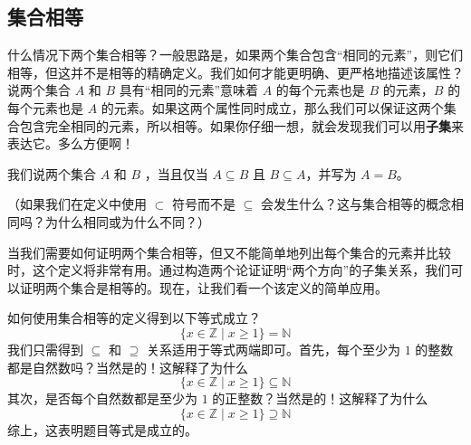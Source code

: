 \subsection{集合相等}

什么情况下两个集合相等？一般思路是，如果两个集合包含``相同的元素''，则它们相等，但这并不是相等的精确定义。我们如何才能更明确、更严格地描述该属性？说两个集合 $A$ 和 $B$ 具有``相同的元素''意味着 $A$ 的每个元素也是 $B$ 的元素，$B$ 的每个元素也是 $A$ 的元素。如果这两个属性同时成立，那么我们可以保证这两个集合包含完全相同的元素，所以相等。如果你仔细一想，就会发现我们可以用\textbf{子集}来表达它。多么方便啊！

\begin{definition}
    我们说两个集合 $A$ 和 $B$ ，当且仅当 $A \subseteq B$ 且 $B \subseteq A$，并写为 $A = B$。
\end{definition}
（如果我们在定义中使用 $\subset$ 符号而不是 $\subseteq$ 会发生什么？这与集合相等的概念相同吗？为什么相同或为什么不同？）

当我们需要如何证明两个集合相等，但又不能简单地列出每个集合的元素并比较时，这个定义将非常有用。通过构造两个论证证明``两个方向''的子集关系，我们可以证明两个集合是相等的。现在，让我们看一个该定义的简单应用。\\

\begin{example}
    如何使用集合相等的定义得到以下等式成立？
    \[\{x \in \mathbb{Z} \mid x \ge 1\} = \mathbb{N}\]
    我们只需得到 $\subseteq$ 和 $\supseteq$ 关系适用于等式两端即可。首先，每个至少为 $1$ 的整数都是自然数吗？当然是的！这解释了为什么
    \[\{x \in \mathbb{Z} \mid x \ge 1\} \subseteq \mathbb{N}\]
    其次，是否每个自然数都是至少为 $1$ 的正整数？当然是的！这解释了为什么
    \[\{x \in \mathbb{Z} \mid x \ge 1\} \supseteq \mathbb{N}\]
    综上，这表明题目等式是成立的。
\end{example}
